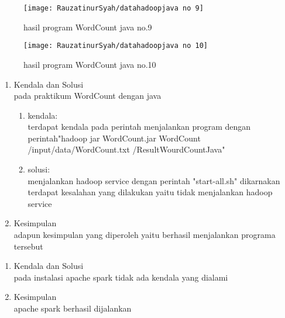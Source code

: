 \begin{figure}[!ht]
\texttt{[image: RauzatinurSyah/datahadoopjava no 9]}
\caption{hasil program WordCount java no.9}
\label{gam:hasil program}
\end{figure}

\begin{figure}[!ht]
\texttt{[image: RauzatinurSyah/datahadoopjava no 10]}
\caption{hasil program WordCount java no.10}
\label{gam:hasil program}
\end{figure}

\begin{enumerate}
\item Kendala dan Solusi \\
pada praktikum WordCount dengan java
\begin{enumerate}
\item kendala: \\
terdapat kendala pada perintah menjalankan program dengan perintah"hadoop jar WordCount.jar WordCount /input/data/WordCount.txt /ResultWourdCountJava"
\item solusi: \\
menjalankan hadoop service dengan perintah "start-all.sh" dikarnakan terdapat kesalahan yang dilakukan yaitu tidak menjalankan hadoop service
\end{enumerate}
\item Kesimpulan\\
adapun kesimpulan yang diperoleh yaitu berhasil menjalankan programa tersebut 
\end{enumerate}

\begin{enumerate}
\item Kendala dan Solusi\\
pada instalasi apache spark tidak ada kendala yang dialami 
\item Kesimpulan\\
apache spark berhasil dijalankan

\end{enumerate}

